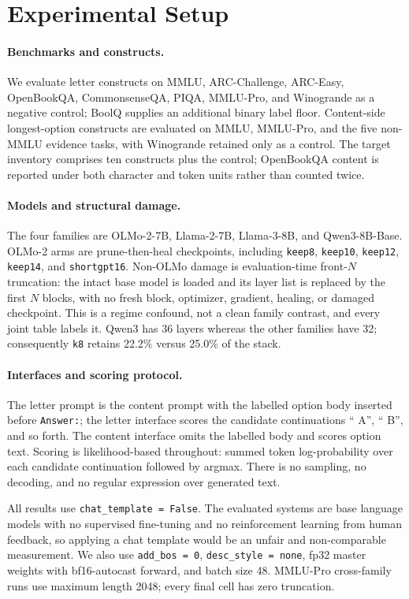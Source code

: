 \section{Experimental Setup}

\paragraph{Benchmarks and constructs.}
We evaluate letter constructs on MMLU, ARC-Challenge, ARC-Easy, OpenBookQA, CommonsenseQA, PIQA, MMLU-Pro, and Winogrande as a negative control; BoolQ supplies an additional binary label floor. Content-side longest-option constructs are evaluated on MMLU, MMLU-Pro, and the five non-MMLU evidence tasks, with Winogrande retained only as a control. The target inventory comprises ten constructs plus the control; OpenBookQA content is reported under both character and token units rather than counted twice.

\paragraph{Models and structural damage.}
The four families are OLMo-2-7B, Llama-2-7B, Llama-3-8B, and Qwen3-8B-Base. OLMo-2 arms are prune-then-heal checkpoints, including \texttt{keep8}, \texttt{keep10}, \texttt{keep12}, \texttt{keep14}, and \texttt{shortgpt16}. Non-OLMo damage is evaluation-time front-$N$ truncation: the intact base model is loaded and its layer list is replaced by the first $N$ blocks, with no fresh block, optimizer, gradient, healing, or damaged checkpoint. This is a regime confound, not a clean family contrast, and every joint table labels it. Qwen3 has 36 layers whereas the other families have 32; consequently \texttt{k8} retains 22.2\% versus 25.0\% of the stack.

\paragraph{Interfaces and scoring protocol.}
The letter prompt is the content prompt with the labelled option body inserted before \texttt{Answer:}; the letter interface scores the candidate continuations `` A'', `` B'', and so forth. The content interface omits the labelled body and scores option text. Scoring is likelihood-based throughout: summed token log-probability over each candidate continuation followed by argmax. There is no sampling, no decoding, and no regular expression over generated text.

All results use \texttt{chat\_template = False}. The evaluated systems are base language models with no supervised fine-tuning and no reinforcement learning from human feedback, so applying a chat template would be an unfair and non-comparable measurement. We also use \texttt{add\_bos = 0}, \texttt{desc\_style = none}, fp32 master weights with bf16-autocast forward, and batch size 48. MMLU-Pro cross-family runs use maximum length 2048; every final cell has zero truncation.

